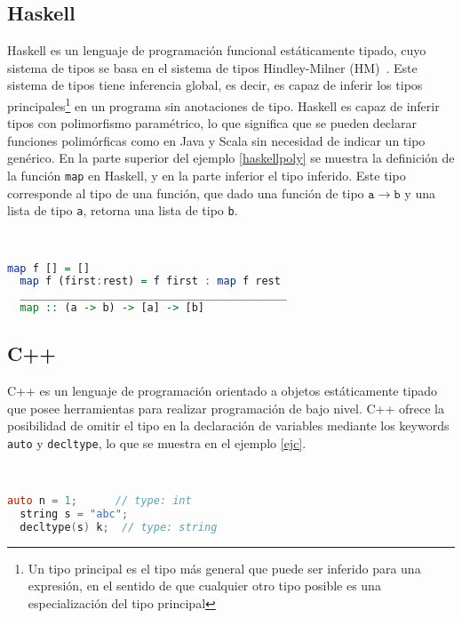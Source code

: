 \subsection{Haskell}
Haskell es un lenguaje de programación funcional estáticamente tipado, cuyo sistema de tipos se basa en el sistema de tipos Hindley-Milner (HM)~\cite{damasmilner}. Este sistema de tipos tiene inferencia global, es decir, es capaz de inferir los tipos principales\footnote{Un tipo principal es el tipo más general que puede ser inferido para una expresión, en el sentido de que cualquier otro tipo posible es una especialización del tipo principal} en un programa sin anotaciones de tipo. Haskell es capaz de inferir tipos con polimorfismo paramétrico, lo que significa que se pueden declarar funciones polimórficas como en Java y Scala sin necesidad de indicar un tipo genérico. En la parte superior del ejemplo \ref{haskellpoly} se muestra la definición de la función \texttt{map} en Haskell, y en la parte inferior el tipo inferido. Este tipo corresponde al tipo de una función, que dado una función de tipo $\mathtt{a \rightarrow b}$ y una lista de tipo \texttt{a}, retorna una lista de tipo \texttt{b}.

\begin{ej} \ \\
  \normalfont
  \label{haskellpoly}
\begin{lstlisting}[language=Haskell]
  map f [] = []
  map f (first:rest) = f first : map f rest
  __________________________________________
  map :: (a -> b) -> [a] -> [b]
\end{lstlisting}
\end{ej}


\subsection{C++}
C++ es un lenguaje de programación orientado a objetos estáticamente tipado que posee herramientas para realizar programación de bajo nivel. C++ ofrece la posibilidad de omitir el tipo en la declaración de variables mediante los keywords \texttt{auto} y \texttt{decltype}, lo que se muestra en el ejemplo \ref{ejc}.

\begin{ej} \ \\
  \normalfont
  \label{ejc}
\begin{lstlisting}[language=C,morekeywords={decltype,string}]
  auto n = 1;      // type: int
  string s = "abc";
  decltype(s) k;  // type: string
\end{lstlisting}
\end{ej}

